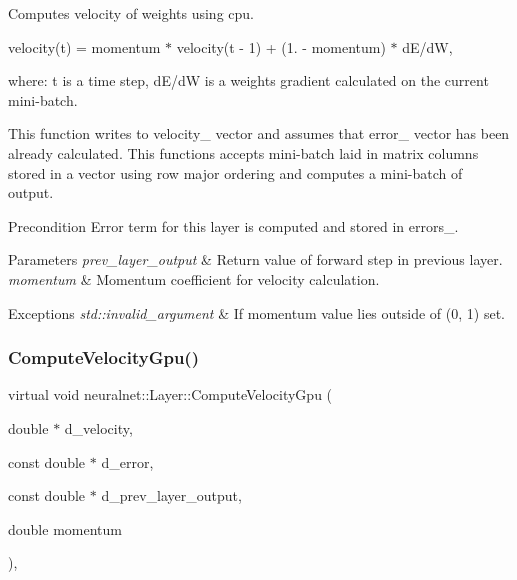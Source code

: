 Computes velocity of weights using cpu. 

velocity(t) = momentum $\ast$ velocity(t -\/ 1) + (1. -\/ momentum) $\ast$ d\+E/dW,

where\+: t is a time step, d\+E/dW is a weights gradient calculated on the current mini-\/batch.

This function writes to velocity\+\_\+ vector and assumes that error\+\_\+ vector has been already calculated. This functions accepts mini-\/batch laid in matrix columns stored in a vector using row major ordering and computes a mini-\/batch of output.

\begin{DoxyPrecond}{Precondition}
Error term for this layer is computed and stored in errors\+\_\+. 
\end{DoxyPrecond}

\begin{DoxyParams}{Parameters}
{\em prev\+\_\+layer\+\_\+output} & Return value of forward step in previous layer. \\
\hline
{\em momentum} & Momentum coefficient for velocity calculation. \\
\hline
\end{DoxyParams}

\begin{DoxyExceptions}{Exceptions}
{\em std\+::invalid\+\_\+argument} & If momentum value lies outside of (0, 1) set. \\
\hline
\end{DoxyExceptions}
\mbox{\label{classneuralnet_1_1Layer_a50fdc0a7f0702795eacf02b29c54f2b0}} 
\subsubsection{\texorpdfstring{Compute\+Velocity\+Gpu()}{ComputeVelocityGpu()}}
{\footnotesize\ttfamily virtual void neuralnet\+::\+Layer\+::\+Compute\+Velocity\+Gpu (\begin{DoxyParamCaption}\item[{double $\ast$}]{d\+\_\+velocity,  }\item[{const double $\ast$}]{d\+\_\+error,  }\item[{const double $\ast$}]{d\+\_\+prev\+\_\+layer\+\_\+output,  }\item[{double}]{momentum }\end{DoxyParamCaption})\hspace{0.3cm}{\ttfamily [protected]}, {\ttfamily [virtual]}}




